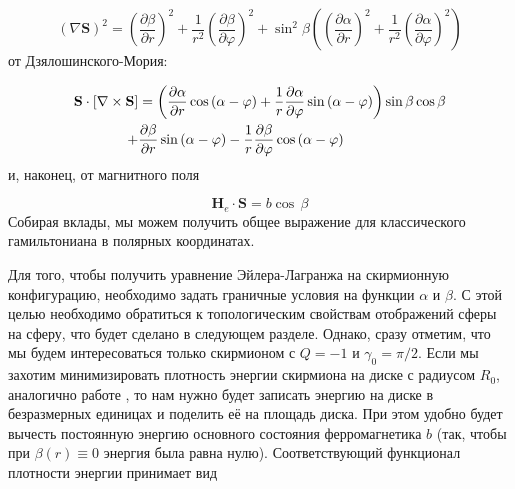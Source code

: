\documentclass[a4paper,article,14pt]{extarticle}
\begin{document}
\begin{equation}
\label{eq:ExchClass}
 {\left( {\nabla {\mathbf{S}}} \right)^2} = {\left( {\frac{{\partial \beta }}{{\partial r}}} \right)^2} + \frac{1}{{{r^2}}}{\left( {\frac{{\partial \beta }}{{\partial \varphi }}} \right)^2} + {\sin ^2}\beta \left( {{{\left( {\frac{{\partial \alpha }}{{\partial r}}} \right)}^2} + \frac{1}{{{r^2}}}{{\left( {\frac{{\partial \alpha }}{{\partial \varphi }}} \right)}^2}} \right)
\end{equation}
от Дзялошинского-Мория:

\begin{equation}
\label{eq:DMclass}
\begin{gathered}
  {\mathbf{S}} \cdot \left[ {\nabla  \times {\mathbf{S}}} \right] = \left( {\frac{{\partial \alpha }}{{\partial r}}\cos \left( {\alpha  - \varphi } \right) + \frac{1}{r}\frac{{\partial \alpha }}{{\partial \varphi }}\sin \left( {\alpha  - \varphi } \right)} \right)\sin \beta \cos \beta  \hfill \\
  \,\,\,\,\,\,\,\,\,\,\,\,\,\,\,\,\,\,\,\,\,\,\, + \frac{{\partial \beta }}{{\partial r}}\sin \left( {\alpha  - \varphi } \right) - \frac{1}{r}\frac{{\partial \beta }}{{\partial \varphi }}\cos \left( {\alpha  - \varphi } \right) \hfill \\ 
\end{gathered}
\end{equation}
и, наконец, от магнитного поля

\begin{equation}
\label{eq:ExtClass}
{\mathbf{H}_e} \cdot {\mathbf{S}} =  b \cos \, \beta 
\end{equation}
Собирая вклады, мы можем получить общее выражение для классического гамильтониана в полярных координатах. 

Для того, чтобы получить уравнение Эйлера-Лагранжа на скирмионную конфигурацию, необходимо задать граничные условия на функции $\alpha$ и $\beta$. С этой целью необходимо обратиться к топологическим свойствам отображений сферы на сферу, что будет сделано в следующем разделе. Однако, сразу отметим, что мы будем интересоваться только скирмионом с $Q=-1$ и $\gamma_0=\pi/2$. Если мы захотим минимизировать плотность энергии скирмиона на диске с радиусом $R_0$, аналогично работе \cite{bogdanov}, то нам нужно будет записать энергию на диске в безразмерных единицах и поделить её на площадь диска. При этом удобно будет вычесть постоянную энергию основного состояния ферромагнетика $b$ (так, чтобы при $\beta \left( r \right) \equiv 0$ энергия была равна нулю). Соответствующий функционал плотности энергии принимает вид
\end{document}
